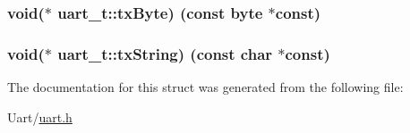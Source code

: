 \subsubsection[{tx\+Byte}]{\setlength{\rightskip}{0pt plus 5cm}void($\ast$ uart\+\_\+t\+::tx\+Byte) (const {\bf byte} $\ast$const)}\label{structuart__t_a19ba83eb9b51411a928172e86f8e24c7}
\hypertarget{structuart__t_acfb091eb7a2d998bc3750b2202aec545}{}
\subsubsection[{tx\+String}]{\setlength{\rightskip}{0pt plus 5cm}void($\ast$ uart\+\_\+t\+::tx\+String) (const char $\ast$const)}\label{structuart__t_acfb091eb7a2d998bc3750b2202aec545}


The documentation for this struct was generated from the following file\+:\begin{DoxyCompactItemize}
\item 
Uart/\hyperlink{uart_8h}{uart.\+h}\end{DoxyCompactItemize}
